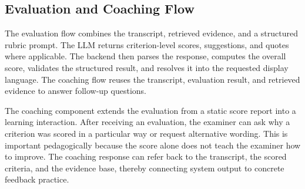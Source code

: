\subsection{Evaluation and Coaching Flow}
The evaluation flow combines the transcript, retrieved evidence, and a
structured rubric prompt. The LLM returns criterion-level scores, suggestions,
and quotes where applicable. The backend then parses the response, computes the
overall score, validates the structured result, and resolves it into the
requested display language. The coaching flow reuses the transcript,
evaluation result, and retrieved evidence to answer follow-up questions.

The coaching component extends the evaluation from a static score report into a
learning interaction. After receiving an evaluation, the examiner can ask why a
criterion was scored in a particular way or request alternative wording. This is
important pedagogically because the score alone does not teach the examiner how
to improve. The coaching response can refer back to the transcript, the scored
criteria, and the evidence base, thereby connecting system output to concrete
feedback practice.
